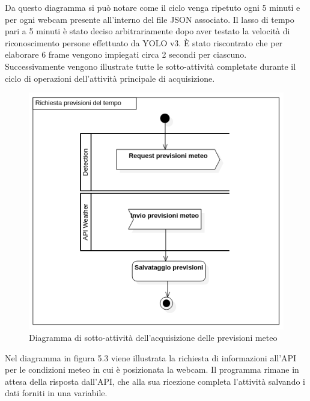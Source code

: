 Da questo diagramma si può notare come il ciclo venga ripetuto ogni 5 minuti e per ogni webcam presente all'interno del file JSON associato.
Il lasso di tempo pari a 5 minuti è stato deciso arbitrariamente dopo aver testato la velocità di riconoscimento persone effettuato da YOLO v3.
È stato riscontrato che per elaborare 6 frame vengono impiegati circa 2 secondi per ciascuno.
Successivamente vengono illustrate tutte le sotto-attività completate durante il ciclo di operazioni dell'attività principale di acquisizione.
\begin{figure}[H]
  \begin{center}
    \includegraphics[scale=0.8]{../immagini/diag_PB/previsioni_del_tempo.png}
    \caption{Diagramma di sotto-attività dell'acquisizione delle previsioni meteo}
  \end{center}
\end{figure}
Nel diagramma in figura 5.3 viene illustrata la richiesta di informazioni all'API per le condizioni meteo in cui è posizionata la webcam. Il programma rimane in attesa della risposta dall'API, che alla sua ricezione completa l'attività salvando i dati forniti in una variabile.
